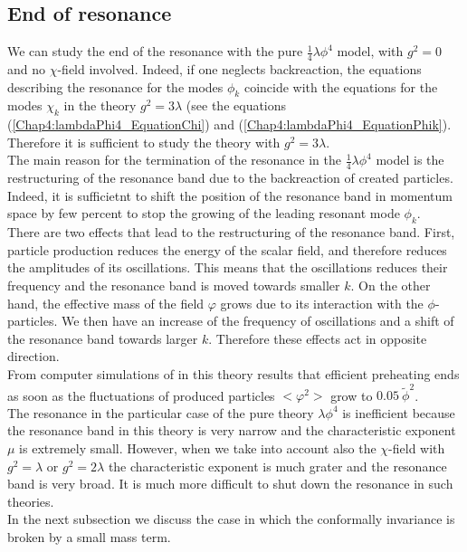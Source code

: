 \documentclass[11pt,a4paper,twoside]{book}
\begin{document}
\subsection{End of resonance}
We can study the end of the resonance with the pure $ \frac{1}{4}\lambda\phi^{4} $ model, with $ g^{2}=0 $ and no $\chi$-field involved. Indeed, if one neglects backreaction, the equations describing the resonance for the modes $\phi_{k}$ coincide with the equations for the modes $\chi_{k}$ in the theory $ g^{2}=3\lambda $ (see the equations (\ref{Chap4:lambdaPhi4_EquationChi}) and (\ref{Chap4:lambdaPhi4_EquationPhik}). Therefore it is sufficient to study the theory with $ g^{2}=3\lambda $.\\
The main reason for the termination of the resonance in the $ \frac{1}{4}\lambda \phi^{4} $ model is the restructuring of the resonance band due to the backreaction of created particles. Indeed, it is sufficietnt to shift the position of the resonance band in momentum space by few percent to stop the growing of the leading resonant mode $\phi_{k}$.\\
There are two effects that lead to the restructuring of the resonance band. First, particle production reduces  the energy  of the scalar field, and therefore reduces the amplitudes of its oscillations. This means that the oscillations reduces their frequency and the resonance band is moved towards smaller $ k $. On the other hand, the effective mass of the field $\varphi$ grows due to its interaction with the $\phi$-particles. We then have an increase of the frequency of oscillations and a shift of the resonance band towards larger $ k $. Therefore these effects act in opposite direction. \\
From computer simulations of \cite{Chap4:ModelLambdaPhi4Reference} in this theory results that efficient preheating ends as soon as the fluctuations of produced particles $ <\varphi^{2}> $ grow to $ 0.05\ \tilde{\phi}^{2} $.\\
The  resonance in the particular case  of the pure theory $ \lambda\phi^{4} $ is inefficient because the resonance band in this theory is very narrow and the characteristic exponent $\mu$ is extremely small. However, when we take into account also the $\chi$-field with $ g^{2}=\lambda $ or $ g^{2}=2\lambda $ the characteristic exponent is much grater and the resonance band is very broad. It is much more difficult to shut down the resonance in such theories.\\
In the next subsection we discuss the case in which the conformally invariance is broken by a small mass term.
\end{document}
